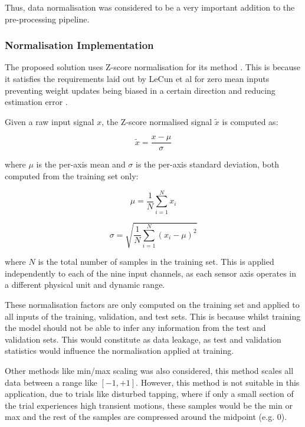 Thus, data normalisation was considered to be a very important addition to the pre-processing pipeline.

\subsubsection{Normalisation Implementation}
The proposed solution uses Z-score normalisation for its method \cite{google_2024_numerical}. This is because it satisfies the requirements laid out by LeCun et al
\cite{lecun_1998_efficient} for zero mean inputs preventing weight updates being biased in a certain direction and reducing estimation error \cite{sola_1997_importance}. 

Given a raw input signal $x$, the Z-score normalised signal $\tilde{x}$ is computed as:

\begin{equation}
    \tilde{x} = \frac{x - \mu}{\sigma}
    \label{eq:zscore}
\end{equation}

where $\mu$ is the per-axis mean and $\sigma$ is the per-axis standard deviation, both computed 
from the training set only:

\begin{equation}
    \mu = \frac{1}{N} \sum_{i=1}^{N} x_i
    \label{eq:mean}
\end{equation}

\begin{equation}
    \sigma = \sqrt{\frac{1}{N} \sum_{i=1}^{N} (x_i - \mu)^2}
    \label{eq:std}
    \end{equation}

where $N$ is the total number of samples in the training set. This is applied independently 
to each of the nine input channels, as each sensor axis operates in a different physical unit 
and dynamic range.

These normalisation factors are only computed on the training set and applied to all inputs of the training, validation, and test sets. This is
because whilst training the model should not be able to infer any information from the test and validation sets. This would constitute as data leakage, 
as test and validation statistics would influence the normalisation applied at training. 

Other methods like min/max scaling was also considered, this method scales all data between a range like $[-1, +1]$.
However, this method is not suitable in this application, due to trials like disturbed tapping, where if only a small section of the trial
experiences high transient motions, these samples would be the min or max and the rest of the samples are compressed around the midpoint (e.g. $0$). 


